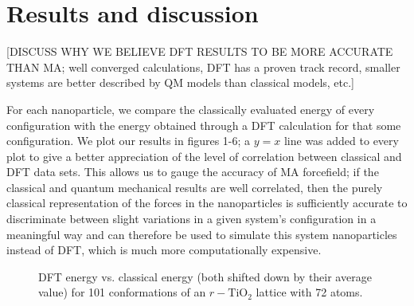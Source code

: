 \documentclass[aps,prb,twocolumn,amsmath,amssymb,superscriptaddress,longbibliography]{revtex4-1}
\newcommand\tab[1][1cm]{\hspace*{#1}} %
\begin{document}
\section*{Results and discussion}

[DISCUSS WHY WE BELIEVE DFT RESULTS TO BE MORE ACCURATE THAN MA; well converged calculations, DFT has a proven track record, smaller systems are better described by QM models than classical models, etc.]

\tab For each nanoparticle, we compare the classically evaluated energy of every configuration with the energy obtained through a DFT calculation for that some configuration. 
We plot our results in figures 1-6; a $y=x$ line was added to every plot to give a better appreciation of the level of correlation between classical and DFT data sets.
This allows us to gauge the accuracy of MA forcefield; if the classical and quantum mechanical results are well correlated, then the purely classical representation of the forces in the nanoparticles is sufficiently accurate to discriminate between slight variations in a given system's configuration in a meaningful way and can therefore be used to simulate this system nanoparticles instead of DFT, which is much more computationally expensive.

\begin{figure}[htb]
\caption{DFT energy vs. classical energy (both shifted down by their average value) for 101 conformations of an $r-\text{TiO}_2$ lattice with 72 atoms.}
\label{rutile72}
\end{figure}
\end{document}
